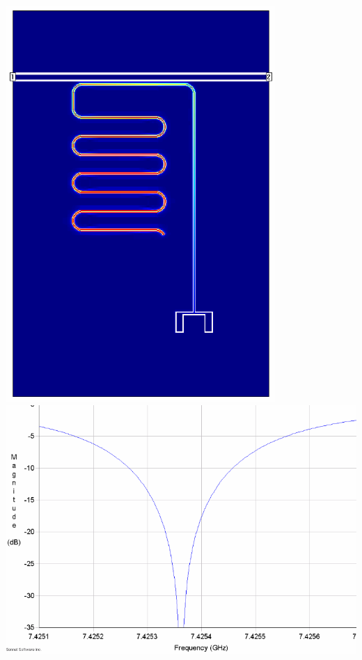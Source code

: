 \documentclass[aspectratio=169, 13pt]{beamer}
\begin{document}
\begin{frame}[c]
{	\vspace{0.5cm}
	\begin{columns}[c]
	\centering
	\includegraphics[height=0.7\textheight]{xmonres_sim_claw}
	\centering
	\includegraphics[width=\textwidth]{xmonres_sim_claw_res}
	\end{columns}
}

\end{frame}
\end{document}
